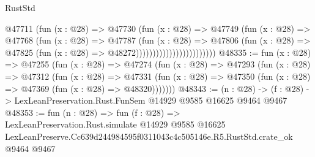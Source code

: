 \begin{lexlean}{RustStd}
\begin{coremodule}
                                    @47711
                                      (fun (x : @28) =>
                                      @47730
                                        (fun (x : @28) =>
                                        @47749
                                          (fun (x : @28) =>
                                          @47768
                                            (fun (x : @28) =>
                                            @47787
                                              (fun (x : @28) =>
                                              @47806
                                                (fun (x : @28) =>
                                                @47825
                                                  (fun (x : @28) => @48272))))))))))))))))))))))))
@48335 := fun (x : @28) =>
  @47255
    (fun (x : @28) =>
    @47274
      (fun (x : @28) =>
      @47293
        (fun (x : @28) =>
        @47312
          (fun (x : @28) =>
          @47331 (fun (x : @28) => @47350 (fun (x : @28) => @47369 (fun (x : @28) => @48320)))))))
@48343 := (n : @28) -> (f : @28) -> LexLeanPreservation.Rust.FunSem @14929 @9585 @16625 @9464 @9467
@48353 := fun (n : @28) =>
  fun (f : @28) =>
  LexLeanPreservation.Rust.simulate
    @14929
    @9585
    @16625
    LexLeanPreserve.Cc639d244984595f0311043c4c505146e.R5.RustStd.crate_ok
    @9464
    @9467
\end{coremodule}
\end{lexlean}
